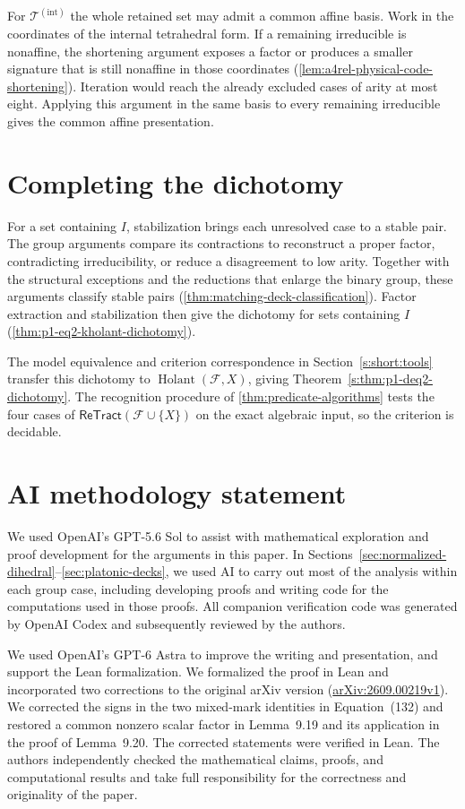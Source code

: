 \documentclass[11pt,letterpaper,onecolumn]{article}
\theoremstyle{plain}
\theoremstyle{definition}
\theoremstyle{remark}
\newcommand{\cF}{\mathcal F}
\newcommand{\Holant}{\operatorname{Holant}}
\newcommand{\ReTract}{\mathsf{ReTract}}
\newcommand{\TetInt}{{\mathcal T^{(\mathrm{int})}}}
\begin{document}
For \(\TetInt\) the whole retained set may admit a common affine basis.
Work in the coordinates of the internal tetrahedral form. If a remaining
irreducible is nonaffine, the shortening argument exposes a factor
or produces a smaller signature that is still nonaffine in those coordinates
(\cref{lem:a4rel-physical-code-shortening}). Iteration
would reach the already excluded cases of arity at most eight. Applying this argument
in the same basis to every remaining irreducible gives the common affine
presentation.
\section{Completing the dichotomy}
For a set containing \(I\), stabilization brings each unresolved case
to a stable pair. The group arguments compare its contractions to
reconstruct a proper factor, contradicting irreducibility, or reduce a
disagreement to low arity. Together with the structural exceptions
and the reductions that enlarge the binary group, these arguments
classify stable pairs (\cref{thm:matching-deck-classification}).
Factor extraction and stabilization then give the dichotomy for sets
containing \(I\) (\cref{thm:p1-eq2-kholant-dichotomy}).

The model equivalence and criterion correspondence in
Section~\ref{s:short:tools} transfer this dichotomy to \(\Holant(\cF,X)\),
giving Theorem~\ref{s:thm:p1-deq2-dichotomy}. The recognition procedure
of \cref{thm:predicate-algorithms} tests the four cases
of \(\ReTract(\cF\cup\{X\})\) on the exact algebraic input, so the
criterion is decidable.

\section*{AI methodology statement}
We used OpenAI's GPT-5.6 Sol to assist with mathematical exploration and proof development for the arguments in this paper. In Sections~\ref{sec:normalized-dihedral}--\ref{sec:platonic-decks}, we used AI to carry out most of the analysis within each group case, including developing proofs and writing code for the computations used in those proofs. All companion verification code was generated by OpenAI Codex and subsequently reviewed by the authors.

We used OpenAI's GPT-6 Astra to improve the writing and presentation, and support the Lean formalization. We formalized the proof in Lean and incorporated two corrections to the original arXiv version (\href{https://arxiv.org/abs/2609.00219v1}{arXiv:2609.00219v1}). We corrected the signs in the two mixed-mark identities in Equation~(132) and restored a common nonzero scalar factor in Lemma~9.19 and its application in the proof of Lemma~9.20. The corrected statements were verified in Lean. The authors independently checked the mathematical claims, proofs, and computational results and take full responsibility for the correctness and originality of the paper.
\label{s:end:main}
\end{document}
